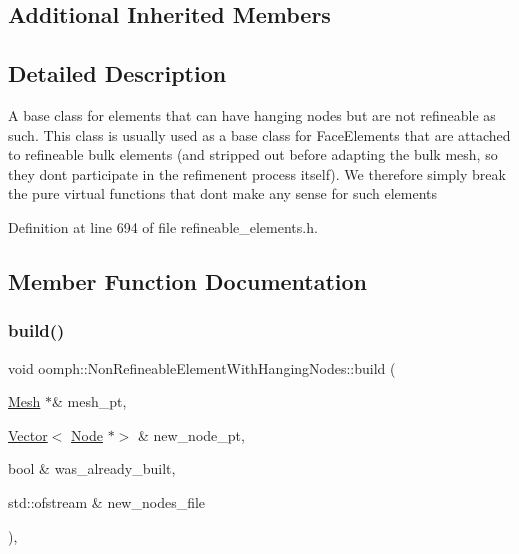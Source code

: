 \subsection*{Additional Inherited Members}


\subsection{Detailed Description}
A base class for elements that can have hanging nodes but are not refineable as such. This class is usually used as a base class for Face\+Elements that are attached to refineable bulk elements (and stripped out before adapting the bulk mesh, so they don\textquotesingle{}t participate in the refimenent process itself). We therefore simply break the pure virtual functions that don\textquotesingle{}t make any sense for such elements 

Definition at line 694 of file refineable\+\_\+elements.\+h.



\subsection{Member Function Documentation}
\mbox{\label{classoomph_1_1NonRefineableElementWithHangingNodes_af1eacf195e0bde91008b4bf4a4854a66}} 
\subsubsection{\texorpdfstring{build()}{build()}}
{\footnotesize\ttfamily void oomph\+::\+Non\+Refineable\+Element\+With\+Hanging\+Nodes\+::build (\begin{DoxyParamCaption}\item[{\hyperlink{classoomph_1_1Mesh}{Mesh} $\ast$\&}]{mesh\+\_\+pt,  }\item[{\hyperlink{classoomph_1_1Vector}{Vector}$<$ \hyperlink{classoomph_1_1Node}{Node} $\ast$$>$ \&}]{new\+\_\+node\+\_\+pt,  }\item[{bool \&}]{was\+\_\+already\+\_\+built,  }\item[{std\+::ofstream \&}]{new\+\_\+nodes\+\_\+file }\end{DoxyParamCaption})\hspace{0.3cm}{\ttfamily [inline]}, {\ttfamily [virtual]}}



